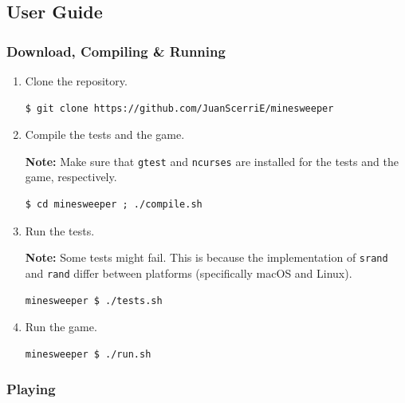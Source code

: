 \documentclass[12pt]{article}
\begin{document}
\subsection{User Guide}

\subsubsection{Download, Compiling \& Running}

\begin{enumerate}
\item
    Clone the repository.
\begin{lstlisting}
$ git clone https://github.com/JuanScerriE/minesweeper
\end{lstlisting}

\item
    Compile the tests and the game.

    \textbf{Note:} Make sure that \texttt{gtest} and
    \texttt{ncurses} are installed for the tests and the game,
    respectively.
\begin{lstlisting}
$ cd minesweeper ; ./compile.sh
\end{lstlisting}

\item
    Run the tests.

    \textbf{Note:} Some tests might fail. This is because the
    implementation of \texttt{srand} and \texttt{rand} differ
    between platforms (specifically macOS and Linux).
\begin{lstlisting}
minesweeper $ ./tests.sh
\end{lstlisting}

\item
    Run the game.
\begin{lstlisting}
minesweeper $ ./run.sh
\end{lstlisting}

\end{enumerate}

\subsubsection{Playing}
\end{document}
